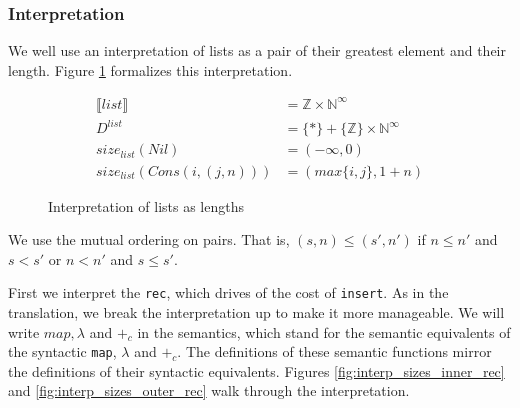 \documentclass[12pt,letterpaper]{article}
\newcommand{\T}[1]{\texttt{#1}}
\begin{document}
\subsubsection{Interpretation}
We well use an interpretation of lists as a pair of their greatest element and their length.
Figure \ref{fig:interp_sizes} formalizes this interpretation.
\begin{figure}[H]
  \caption{Interpretation of lists as lengths}
  \label{fig:interp_sizes}
  \begin{align*}
    \llbracket list \rrbracket &= \mathbb{Z} \times \mathbb{N}^\infty \\
    D^{list} &= \{\ast\} + \{\mathbb{Z}\} \times \mathbb{N}^\infty \\
    size_{list} (Nil) &= (-\infty,0) \\
    size_{list} (Cons(i,(j,n))) &= (max\{i,j\},1 + n)
  \end{align*}
\end{figure}
We use the mutual ordering on pairs.
That is, $(s,n) \leq (s',n')$ if $n \leq n'$ and $s < s'$ or $n < n'$ and $s \leq s'$.

First we interpret the \T{rec}, which drives of the cost of \T{insert}.
As in the translation, we break the interpretation up to make it more manageable.
We will write $map, \lambda$ and $+_c$ in the semantics, which stand for the semantic equivalents of the syntactic \T{map}, $\lambda$ and $+_c$.
The definitions of these semantic functions mirror the definitions of their syntactic equivalents.
Figures \ref{fig:interp_sizes_inner_rec} and \ref{fig:interp_sizes_outer_rec} walk through the interpretation.
\end{document}
